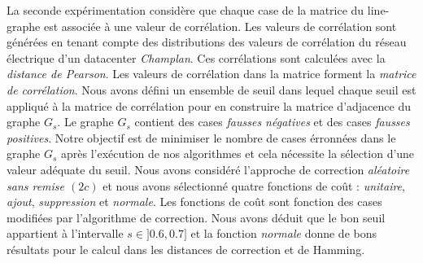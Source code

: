 La seconde exp\'erimentation consid\`ere que chaque case de la matrice du line-graphe est associ\'ee \`a une valeur de corr\'elation.  Les valeurs de corr\'elation sont g\'en\'er\'ees en tenant compte des distributions des valeurs de corr\'elation  du r\'eseau \'electrique d'un datacenter {\em Champlan}. Ces corr\'elations sont calcul\'ees avec la {\em distance de Pearson}. Les valeurs de corr\'elation dans la matrice forment la {\em matrice de corr\'elation}. Nous avons d\'efini un ensemble de seuil dans lequel chaque seuil est appliqu\'e \`a la matrice de corr\'elation pour en construire la matrice d'adjacence du graphe $G_s$. Le graphe $G_s$ contient des cases {\em fausses n\'egatives} et des cases {\em fausses positives}. 
Notre objectif est de minimiser le nombre de cases \'erronn\'ees dans le graphe $G_s$ apr\`es l'ex\'ecution de nos algorithmes et cela n\'ecessite la s\'election d'une valeur ad\'equate du seuil. 
Nous avons consid\'er\'e l'approche de correction  {\em al\'eatoire sans remise $(2c)$} et nous avons s\'electionn\'e quatre fonctions de co\^ut : {\em unitaire}, {\em ajout}, {\em suppression} et {\em normale}. Les fonctions de co\^ut sont fonction des cases modifi\'ees par l'algorithme de correction.
Nous avons d\'eduit que le bon seuil appartient \`a l'intervalle $s \in ]0.6,0.7]$ et la fonction {\em normale} donne de bons r\'esultats pour le calcul dans les distances de correction et de Hamming.
\newline


